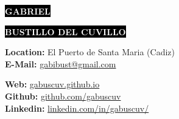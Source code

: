 \documentclass[9pt]{developercv} %
\begin{document}




\begin{minipage}[t]{0.45\textwidth} %
	\vspace{-\baselineskip} %
	
	\colorbox{black}{{\huge\textcolor{white}{\textbf{\MakeUppercase{Gabriel}}}}} %
	
	\colorbox{black}{{\huge\textcolor{white}{\textbf{\MakeUppercase{Bustillo del Cuvillo}}}}} %
	
	\vspace{6pt}
	
	{\huge \GetTitleLocalized{\langsa}{\jobtype}} %
\end{minipage}
\begin{minipage}[t]{0.233\textwidth} %
	\vspace{-\baselineskip} %
	
	\textbf{Location: }{El Puerto de Santa Maria (Cadiz)}\\
	\textbf{E-Mail: }{\href{mailto:gabibust@gmail.com}{gabibust@gmail.com}}\\	
\end{minipage}
\begin{minipage}[t]{0.30\textwidth} %
	\vspace{-\baselineskip} %
	
	\textbf{Web: }{\href{https://gabuscuv.github.io}{gabuscuv.github.io}}\\
	\textbf{Github: }{\href{https://github.com/gabuscuv}{github.com/gabuscuv}}\\
	\textbf{Linkedin: }{\href{https://www.linkedin.com/in/gabuscuv/}{linkedin.com/in/gabuscuv/}}\\
\end{minipage}
\end{document}
